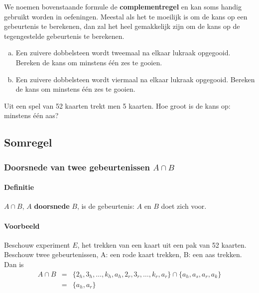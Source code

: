 \documentclass[12pt,twoside]{article}
\begin{document}
We noemen bovenstaande formule de {\bf complementregel} en kan soms handig gebruikt worden in oefeningen. Meestal als het te moeilijk is om de kans op een gebeurtenis te berekenen, dan zal het heel gemakkelijk zijn om de kans op de tegengestelde gebeurtenis te berekenen.

\begin{oefening}
  \begin{enumerate}[(a)]
  \item Een zuivere dobbelsteen wordt tweemaal na elkaar lukraak opgegooid. Bereken de kans om minstens één zes te gooien.
  \item Een zuivere dobbelsteen wordt viermaal na elkaar lukraak opgegooid. Bereken de kans om minstens één zes te gooien.
  \end{enumerate}
\end{oefening}

\begin{oefening}
Uit een spel van 52 kaarten trekt men 5 kaarten. Hoe groot is de kans op: minstens één aas?
\end{oefening}

\subsection{Somregel}

\subsubsection{Doorsnede van twee gebeurtenissen $A\cap B$}

\paragraph*{Definitie}
$A\cap B$, $A$ {\bf doorsnede} $B$, is de gebeurtenis: $A$ en $B$ doet zich voor.

\paragraph*{Voorbeeld}
Beschouw experiment $E$, het trekken van een kaart uit een pak van 52 kaarten. Beschouw twee gebeurtenissen, A: een rode kaart trekken, B: een aas trekken. Dan is\\
\begin{eqnarray*}
A\cap B &=& \{2_h, 3_h, \ldots, k_h, a_h, 2_r, 3_r, \ldots, k_r, a_r\}\cap\{a_h, a_s, a_r, a_k\}\\
        &=& \{a_h, a_r\}
\end{eqnarray*}
\end{document}
